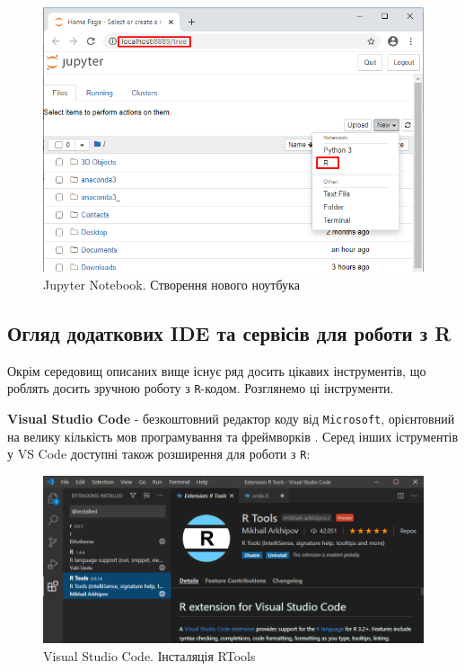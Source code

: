 \documentclass[
]{book}
\begin{document}
\begin{figure}
\centering
\includegraphics{images/chapter1/anaconda_6.png}
\caption{\label{fig:unnamed-chunk-27}Jupyter Notebook. Створення нового ноутбука}
\end{figure}

\hypertarget{chapter134}{%
\subsection{Огляд додаткових IDE та сервісів для роботи з R}\label{chapter134}}

Окрім середовищ описаних вище існує ряд досить цікавих інструментів, що роблять досить зручною роботу з \texttt{R}-кодом. Розглянемо ці інструменти.

\textbf{Visual Studio Code} - безкоштовний редактор коду від \texttt{Microsoft}, орієнтовний на велику кількість мов програмування та фреймворків \citep{vs-code}. Серед інших іструментів у VS Code доступні також розширення для роботи з \texttt{R}:

\begin{figure}
\centering
\includegraphics{images/chapter1/vs_code.png}
\caption{\label{fig:unnamed-chunk-28}Visual Studio Code. Інсталяція RTools}
\end{figure}
\end{document}
